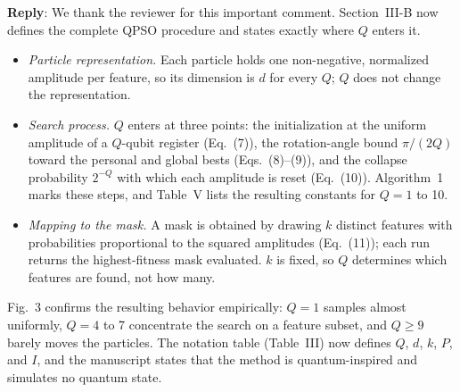 \documentclass[11pt]{article}
\newcommand{\reply}{\noindent\textbf{Reply}: }
\begin{document}
\reply We thank the reviewer for this important comment. Section~III-B now
defines the complete QPSO procedure and states exactly where $Q$ enters it.
\begin{itemize}[leftmargin=*,itemsep=1pt]
  \item \textit{Particle representation.} Each particle holds one
        non-negative, normalized amplitude per feature, so its dimension is
        $d$ for every $Q$; $Q$ does not change the representation.
  \item \textit{Search process.} $Q$ enters at three points: the
        initialization at the uniform amplitude of a $Q$-qubit register
        (Eq.~(7)), the rotation-angle bound $\pi/(2Q)$ toward the personal and
        global bests (Eqs.~(8)--(9)), and the collapse probability $2^{-Q}$
        with which each amplitude is reset (Eq.~(10)). Algorithm~1 marks these
        steps, and Table~V lists the resulting constants for $Q=1$ to 10.
  \item \textit{Mapping to the mask.} A mask is obtained by drawing $k$
        distinct features with probabilities proportional to the squared
        amplitudes (Eq.~(11)); each run returns the highest-fitness mask
        evaluated. $k$ is fixed, so $Q$ determines which features are found,
        not how many.
\end{itemize}
Fig.~3 confirms the resulting behavior empirically: $Q=1$ samples almost
uniformly, $Q=4$ to 7 concentrate the search on a feature subset, and
$Q\ge9$ barely moves the particles. The notation table (Table~III) now
defines $Q$, $d$, $k$, $P$, and $I$, and the manuscript states that the
method is quantum-inspired and simulates no quantum state.
\end{document}
